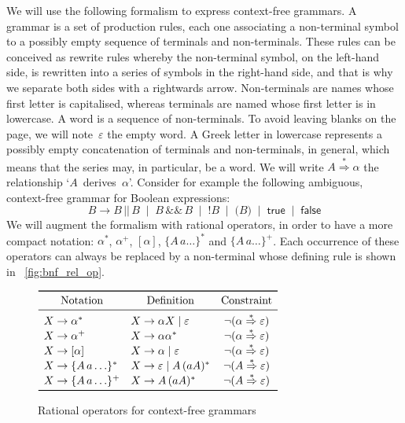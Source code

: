 We will use the following formalism to express context\hyp{}free
grammars. A grammar is a set of production rules, each one associating
a non\hyp{}terminal symbol to a possibly empty sequence of terminals
and non\hyp{}terminals. These rules can be conceived as rewrite rules
whereby the non\hyp{}terminal symbol, on the left\hyp{}hand side, is
rewritten into a series of symbols in the right\hyp{}hand side, and
that is why we separate both sides with a rightwards
arrow. Non\hyp{}terminals are names whose first letter is capitalised,
whereas terminals are named whose first letter is in lowercase. A word
is a sequence of non\hyp{}terminals. To avoid leaving blanks on the
page, we will note~\(\varepsilon\) the empty word. A Greek letter in
lowercase represents a possibly empty concatenation of terminals and
non\hyp{}terminals, in general, which means that the series may, in
particular, be a word. We will write \(A \stackrel{*}{\Rightarrow}
\alpha\) the relationship `$A$~derives~$\alpha$'. Consider for example
the following ambiguous, context\hyp{}free grammar for Boolean
expressions:
\begin{equation*}
B \rightarrow B \, \textsf{||} \, B \; \mid \; B \, \textsf{\&\&} \, B
\; \mid \; \textsf{!}B \; \mid \; \textsf{(}B\textsf{)}
\; \mid \; \textsf{true} \; \mid \; \textsf{false}
\end{equation*}
We will augment the formalism with rational operators, in order to
have a more compact notation: \(\alpha^*\), \(\alpha^+\),
\([\alpha]\), \(\{ A \, a \dots \}^*\) and \(\{ A \, a \dots
\}^+\). Each occurrence of these operators can always be replaced by a
non\hyp{}terminal whose defining rule is shown in
\fig~\vref{fig:bnf_rel_op}.
\begin{figure}
\centering
\(
\begin{array}{llc}
\toprule
  \multicolumn{1}{c}{\text{Notation}}
& \multicolumn{1}{c}{\text{Definition}}
& \multicolumn{1}{c}{\text{Constraint}}\\
\midrule
  X \rightarrow \alpha^* 
& X \rightarrow \alpha X \mid \varepsilon
& \neg(\alpha \stackrel{*}{\Rightarrow} \varepsilon)\\
  X \rightarrow \alpha^+ 
& X \rightarrow \alpha \alpha^*
& \neg(\alpha \stackrel{*}{\Rightarrow} \varepsilon)\\
  X \rightarrow [\alpha]
& X \rightarrow \alpha \mid \varepsilon
& \neg(\alpha \stackrel{*}{\Rightarrow} \varepsilon)\\
  X \rightarrow \{A \, a \ldots\}^*
& X \rightarrow \varepsilon \mid A \, (a A)^*
& \neg(A \stackrel{*}{\Rightarrow} \varepsilon)\\
  X \rightarrow \{A \, a \ldots\}^+
& X \rightarrow A \, (a A)^*
& \neg(A \stackrel{*}{\Rightarrow} \varepsilon)\\
\bottomrule
\end{array}\)
\caption{Rational operators for context\hyp{}free grammars
\label{fig:bnf_rel_op}}
\end{figure}
